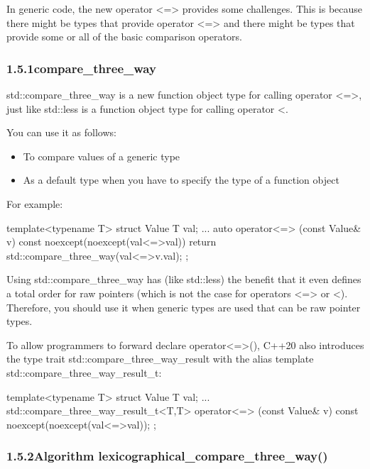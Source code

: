 
In generic code, the new operator <=> provides some challenges. This is because there might be types that provide operator <=> and there might be types that provide some or all of the basic comparison operators.

\subsubsection*{ 1.5.1\hspace{0.2cm}compare\_three\_way}

std::compare\_three\_way is a new function object type for calling operator <=>, just like std::less is a function object type for calling operator <.

You can use it as follows:

\begin{itemize}
\item
To compare values of a generic type

\item
As a default type when you have to specify the type of a function object
\end{itemize}

For example:

\begin{cpp}
template<typename T>
struct Value {
	T val{};
	...
	auto operator<=> (const Value& v) const noexcept(noexcept(val<=>val)) {
		return std::compare_three_way{}(val<=>v.val);
	}
};
\end{cpp}

Using std::compare\_three\_way has (like std::less) the benefit that it even defines a total order for raw pointers (which is not the case for operators <=> or <). Therefore, you should use it when generic types are used that can be raw pointer types.

To allow programmers to forward declare operator<=>(), C++20 also introduces the type trait std::compare\_three\_way\_result with the alias template std::compare\_three\_way\_result\_t:

\begin{cpp}
template<typename T>
struct Value {
	T val{};
	...
	std::compare_three_way_result_t<T,T>
		operator<=> (const Value& v) const noexcept(noexcept(val<=>val));
};
\end{cpp}

\subsubsection*{ 1.5.2\hspace{0.2cm}Algorithm lexicographical\_compare\_three\_way()}

